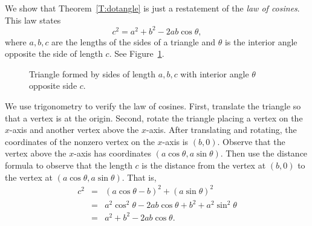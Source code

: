 \documentclass{ximera}
\begin{document}
We show that Theorem~\ref{T:dotangle} is just a restatement of the
{\em law of cosines\/}.  This law states 
\[
c^2 = a^2 + b^2 - 2ab\cos\theta,
\]
where $a,b,c$ are the lengths of the sides of a triangle and $\theta$
is the interior angle opposite the side of length $c$.   See Figure~\ref{F:cosines}.

\begin{figure}[htb]
  \begin{center}
  \end{center}
     \caption{Triangle formed by sides of length $a,b,c$ with interior
	angle $\theta$ opposite side $c$.}
     \label{F:cosines}
\end{figure}

We use trigonometry to verify the law of cosines.  First, translate
the triangle so that a vertex is at the origin.  Second, rotate the
triangle placing a vertex on the $x$-axis and another vertex above the
$x$-axis.  After translating and rotating, the coordinates of the
nonzero vertex on the $x$-axis is $(b,0)$.  Observe that the vertex
above the $x$-axis has coordinates $(a\cos\theta,a\sin\theta)$.  Then
use the distance formula to observe that the length $c$ is the
distance from the vertex at $(b,0)$ to the vertex at
$(a\cos\theta,a\sin\theta)$.  That is,
\[
\begin{array}{rcl}
c^2 & = & (a\cos\theta - b)^2 + (a\sin\theta)^2\\
& = & a^2\cos^2\theta - 2ab\cos\theta + b^2 + a^2\sin^2\theta\\
& = & a^2 + b^2 - 2ab\cos\theta.
\end{array}
\]
\end{document}
